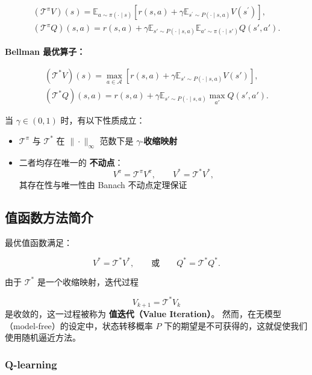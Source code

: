\documentclass[oneside]{ctexbook}
\begin{document}
\begin{gather}
(\mathcal T^\pi V)(s)
=
\mathbb E_{a\sim\pi(\cdot\mid s)}
\left[
r(s,a)
+
\gamma
\mathbb E_{s^\prime\sim P(\cdot\mid s,a)} V(s^\prime)
\right],\\
(\mathcal T^\pi Q)(s,a)
=
r(s,a)
+
\gamma
\mathbb E_{s'\sim P(\cdot\mid s,a)}
\mathbb E_{a'\sim\pi(\cdot\mid s')}
Q(s',a').
\end{gather}

\textbf{Bellman 最优算子：}

\begin{gather}
(\mathcal T^\ast V)(s)
=
\max_{a\in\mathcal A}
\left[
r(s,a)
+
\gamma
\mathbb E_{s'\sim P(\cdot\mid s,a)} V(s')
\right],\\
(\mathcal T^\ast Q)(s,a)
=
r(s,a)
+
\gamma
\mathbb E_{s'\sim P(\cdot\mid s,a)}
\max_{a'} Q(s',a').
\end{gather}

当 $\gamma \in (0,1)$ 时，有以下性质成立：

\begin{itemize}
\item $\mathcal T^{\pi}$ 与 $\mathcal T^{\ast}$ 在 $\|\cdot\|_\infty$ 范数下是 $\gamma$-\textbf{收缩映射}
\item 二者均存在唯一的 \textbf{不动点}：
\[
V^{\pi} = \mathcal T^{\pi} V^{\pi}, 
\qquad
V^{\ast} = \mathcal T^{\ast} V^{\ast},
\]
其存在性与唯一性由 Banach 不动点定理保证
\end{itemize}

\subsection{值函数方法简介}

最优值函数满足：

\begin{equation}
V^{\ast} = \mathcal T^{\ast} V^{\ast},
\qquad
\text{或}
\qquad
Q^{\ast} = \mathcal T^{\ast} Q^{\ast}.
\end{equation}

由于 $\mathcal T^\ast$ 是一个收缩映射，迭代过程

\begin{equation}
V_{k+1} = \mathcal T^{\ast} V_k
\end{equation}
是收敛的，这一过程被称为 \textbf{值迭代（Value Iteration）}。
然而，在无模型（model-free）的设定中，状态转移概率 $P$ 下的期望是不可获得的，这就促使我们使用随机逼近方法。

\subsubsection{Q-learning}
\end{document}
